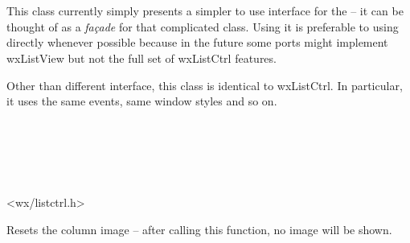 
\section{}\label{wxlistview}

This class currently simply presents a simpler to use interface for the 
 -- it can be thought of as a {\it fa\c{c}ade}
for that complicated class. Using it is preferable to using 
 directly whenever possible because in the
future some ports might implement wxListView but not the full set of wxListCtrl
features.

Other than different interface, this class is identical to wxListCtrl. In
particular, it uses the same events, same window styles and so on.


\\
\\
\\
\\


<wx/listctrl.h>




\label{wxlistviewclearcolumnimage}


Resets the column image -- after calling this function, no image will be shown.



